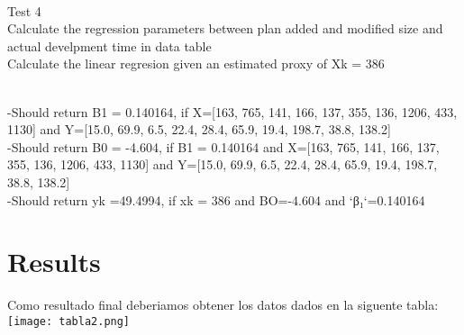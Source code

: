 \documentclass{article}
\begin{document}
{\\Test 4\\
Calculate the regression parameters between plan added and modified size and actual develpment time in data table
\\Calculate the linear regresion given an estimated proxy of Xk = 386

\\-Should return B1 = 0.140164, if X=[163, 765, 141, 166, 137, 355, 136, 1206, 433, 1130] and Y=[15.0, 69.9, 6.5, 22.4, 28.4, 65.9, 19.4, 198.7, 38.8, 138.2]
\\-Should return B0 = -4.604, if B1 = 0.140164 and X=[163, 765, 141, 166, 137, 355, 136, 1206, 433, 1130] and Y=[15.0, 69.9, 6.5, 22.4, 28.4, 65.9, 19.4, 198.7, 38.8, 138.2]
\\-Should return yk =49.4994, if xk = 386 and BO=-4.604 and `β₁`=0.140164}

\section{Results}
{Como resultado final deberiamos obtener los datos dados en la siguente tabla:}\\
\texttt{[image: tabla2.png]}
\end{document}
